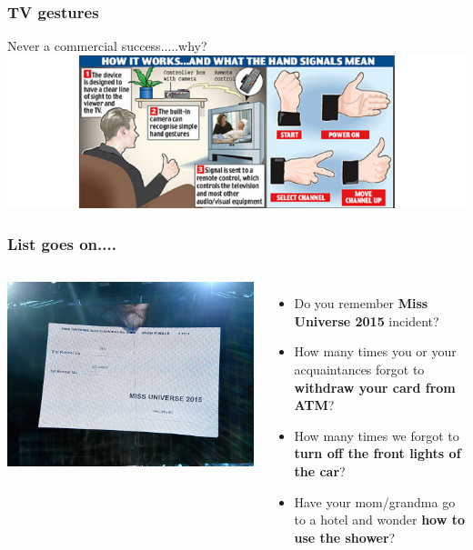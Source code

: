\documentclass{beamer}
\begin{document}
\begin{frame}
\frametitle{TV gestures}
\centering
Never a commercial success.....why?
\newline \newline
\includegraphics[width=1\linewidth]{tvgestures}
\end{frame}

\begin{frame}
\frametitle{List goes on....}
\begin{columns}[c] %
	
	\centering
	\includegraphics[width=1\linewidth]{universe}\newline
	
	\begin{itemize}
		\item Do you remember \textbf{Miss Universe 2015} incident?
		\item How many times you or your acquaintances forgot to \textbf{withdraw your card from ATM}?
		\item How many times we forgot to \textbf{turn off the front lights of the car}?
		\item Have your mom/grandma go to a hotel and wonder \textbf{how to use the shower}?
	\end{itemize}
\end{columns}
\end{frame}
\end{document}
